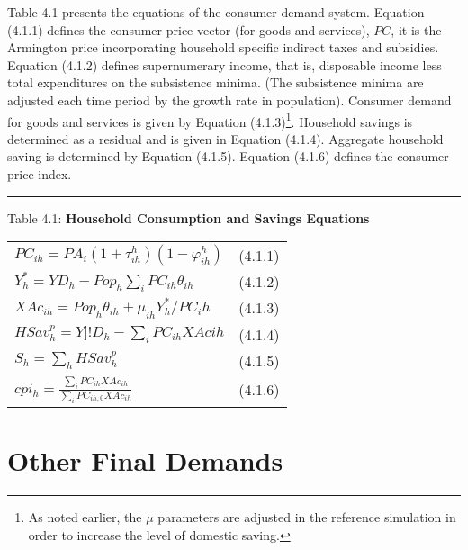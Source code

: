 \documentclass[12pt]{article}
\begin{document}
Table 4.1 presents the equations of the consumer demand system. Equation (4.1.1) defines the consumer price vector (for goods and services), $PC$, it is the Armington price incorporating household specific indirect taxes and subsidies. Equation (4.1.2) defines supernumerary income, that is, disposable income less total expenditures on the subsistence minima. (The subsistence minima are adjusted each time period by the growth rate in population). Consumer demand for goods and services is given by Equation (4.1.3)\footnote{ As noted earlier, the $\mu$ parameters are adjusted in the reference simulation in order to increase the level of domestic saving.}. Household savings is determined as a residual and is given in Equation (4.1.4). Aggregate household saving is determined by Equation (4.1.5). Equation (4.1.6) defines the consumer price index.

\newpage

\noindent\rule{\linewidth}{0.4pt}
\begin{center}
\begin{large}
{\centering Table 4.1: \textbf{Household Consumption and Savings Equations} \par}

\begin{tabular}{>{\raggedright}p{} l}

$PC_{ih} = P\!A_i\left(1 + \tau^h_{ih}\right)\left(1 - \varphi^h_{ih}\right)$ & (4.1.1)\\[15pt]

$Y^*_h = Y\!D_h - Pop_h \displaystyle \sum_i PC_{ih} \theta_{ih}$ & (4.1.2)\\[15pt]

$XAc_{ih} = Pop_h\theta_{ih} + \mu_{ih}Y^*_h / PC_ih$ & (4.1.3) \\[15pt]

$HSav^p_h = Y]!D_h - \displaystyle \sum_i PC_{ih}XAc{ih}$ & (4.1.4) \\[15pt]

$S_h = \displaystyle \sum_h HSav^p_h$ & (4.1.5) \\[15pt]

$cpi_h = \frac{\displaystyle \sum_i PC_{ih}XAc_{ih}}{\displaystyle \sum_i PC_{ih, 0}XAc_{ih}}$ & (4.1.6) \\[20pt]

\hline
\end{tabular}
\end{large}
\end{center}

\section{Other Final Demands}
\end{document}
